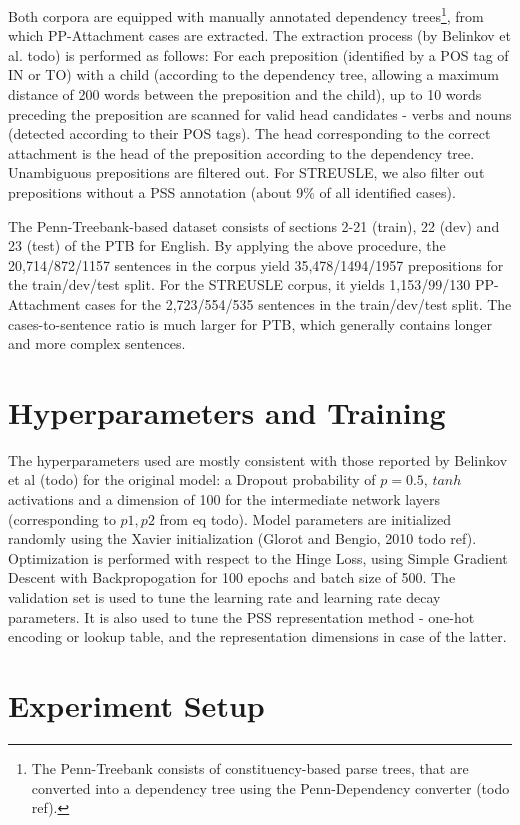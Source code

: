 Both corpora are equipped with manually annotated dependency trees\footnote{The Penn-Treebank consists of constituency-based parse trees, that are converted into a dependency tree using the Penn-Dependency converter (todo ref).}, from which PP-Attachment cases are extracted. The extraction process (by Belinkov et al. todo) is performed as follows: For each preposition (identified by a POS tag of IN or TO) with a child (according to the dependency tree, allowing a maximum distance of 200 words between the preposition and the child), up to 10 words preceding the preposition are scanned for valid head candidates - verbs and nouns (detected according to their POS tags). The head corresponding to the correct attachment is the head of the preposition according to the dependency tree. Unambiguous prepositions are filtered out. For STREUSLE, we also filter out prepositions without a PSS annotation (about 9\% of all identified cases).

The Penn-Treebank-based dataset consists of sections 2-21 (train), 22 (dev) and 23 (test) of the PTB for English. By applying the above procedure, the 20,714/872/1157 sentences in the corpus yield 35,478/1494/1957 prepositions for the train/dev/test split. For the STREUSLE corpus, it yields 1,153/99/130 PP-Attachment cases for the 2,723/554/535 sentences in the train/dev/test split. The cases-to-sentence ratio is much larger for PTB, which generally contains longer and more complex sentences. 
    
\section{Hyperparameters and Training}

The hyperparameters used are mostly consistent with those reported by Belinkov et al (todo) for the original model: a Dropout probability of $p = 0.5$, $tanh$ activations and a dimension of 100 for the intermediate network layers (corresponding to $p1, p2$ from eq todo). Model parameters are initialized randomly using the Xavier initialization (Glorot and Bengio, 2010 todo ref). Optimization is performed with respect to the Hinge Loss, using Simple Gradient Descent with Backpropogation for 100 epochs and batch size of 500. The validation set is used to tune the learning rate and learning rate decay parameters. It is also used to tune the PSS representation method - one-hot encoding or lookup table, and the representation dimensions in case of the latter.

\section{Experiment Setup}

